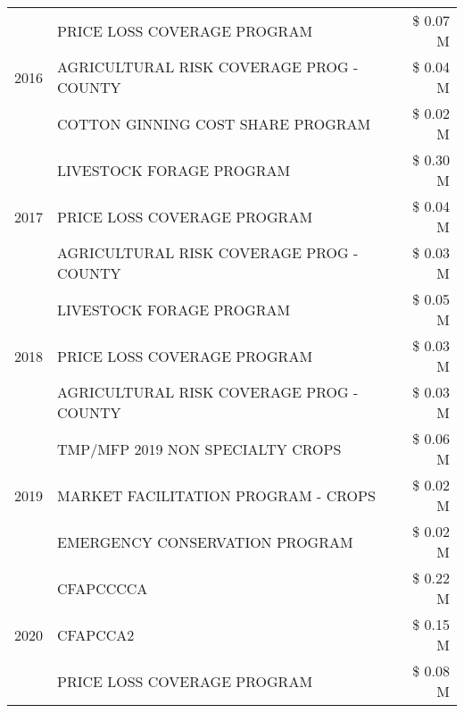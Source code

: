 \begin{tabular}{llr}
\cline{1-3}
\multirow[t]{3}{*}{2016} & PRICE LOSS COVERAGE PROGRAM                   & \$ 0.07 M \\
 & AGRICULTURAL RISK COVERAGE PROG - COUNTY      & \$ 0.04 M \\
 & COTTON GINNING COST SHARE PROGRAM             & \$ 0.02 M \\
\cline{1-3}
\multirow[t]{3}{*}{2017} & LIVESTOCK FORAGE PROGRAM & \$ 0.30 M \\
 & PRICE LOSS COVERAGE PROGRAM & \$ 0.04 M \\
 & AGRICULTURAL RISK COVERAGE PROG - COUNTY & \$ 0.03 M \\
\cline{1-3}
\multirow[t]{3}{*}{2018} & LIVESTOCK FORAGE PROGRAM & \$ 0.05 M \\
 & PRICE LOSS COVERAGE PROGRAM & \$ 0.03 M \\
 & AGRICULTURAL RISK COVERAGE PROG - COUNTY & \$ 0.03 M \\
\cline{1-3}
\multirow[t]{3}{*}{2019} & TMP/MFP 2019 NON SPECIALTY CROPS & \$ 0.06 M \\
 & MARKET FACILITATION PROGRAM - CROPS & \$ 0.02 M \\
 & EMERGENCY CONSERVATION PROGRAM & \$ 0.02 M \\
\cline{1-3}
\multirow[t]{3}{*}{2020} & CFAPCCCCA & \$ 0.22 M \\
 & CFAPCCA2 & \$ 0.15 M \\
 & PRICE LOSS COVERAGE PROGRAM & \$ 0.08 M \\
\cline{1-3}
\bottomrule
\end{tabular}
